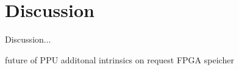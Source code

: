 \chapter{Discussion}
\label{chapter:discussion}

Discussion...


future of PPU
additonal intrinsics on request
FPGA speicher

